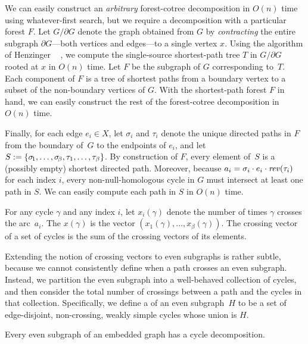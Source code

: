 We can easily construct an \emph{arbitrary} forest-cotree decomposition in $O(n)$ time using whatever-first search, but we require a decomposition with a particular forest $F$.  Let $G/\partial G$ denote the graph obtained from $G$ by \emph{contracting} the entire subgraph $\partial G$---both vertices and edges---to a single vertex $x$.  Using the algorithm of Henzinger \etal~\cite{hkrs-fspap-97} , we compute the single-source shortest-path tree $T$ in $G/\partial G$ rooted at $x$ in $O(n)$ time.  Let $F$ be the subgraph of $G$ corresponding to~$T$.  Each component of $F$ is a tree of shortest paths from a boundary vertex to a subset of the non-boundary vertices of $G$.  With the shortest-path forest $F$ in hand, we can easily construct the rest of the forest-cotree decomposition in $O(n)$ time.

Finally, for each edge $e_i\in X$, let $\sigma_i$ and $\tau_i$ denote the unique directed paths in $F$ from the boundary of~$G$ to the endpoints of $e_i$, and let $S := \{ \sigma\!_1, \dots, \sigma\!_\beta, \allowbreak \tau_1, \dots, \tau_\beta \}$.  By construction of $F$, every element of~$S$ is a (possibly empty) shortest directed path.  Moreover, because $a_i = \sigma_i \cdot e_i \cdot \mathit{rev}(\tau_i)$ for each index $i$, every non-null-homologous cycle in $G$ must intersect at least one path in $S$.  We can easily compute each path in $S$ in $O(n)$ time.

For any cycle $\gamma$ and any index $i$, let $x_i(\gamma)$ denote the number of times $\gamma$ crosses the arc~$a_i$.  The  $x(\gamma)$ is the vector $(x_1(\gamma), \dots, x_\beta(\gamma))$.  The crossing vector of a set of cycles is the sum of the crossing vectors of its elements.

Extending the notion of crossing vectors to even subgraphs is rather subtle, because we cannot consistently define when a path crosses an even subgraph.  Instead, we partition the even subgraph into a well-behaved collection of cycles, and then consider the total number of crossings between a path and the cycles in that collection.  Specifically, we define a  of an even subgraph~$H$ to be a set of edge-disjoint, non-crossing, weakly simple cycles whose union is $H$.
\begin{lemma}
\label{lem:decomposition}
Every even subgraph of an embedded graph has a cycle decomposition.
\end{lemma}

